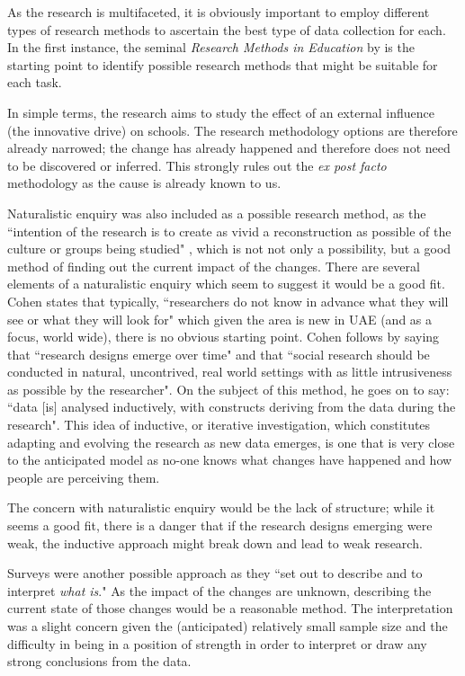 \documentclass[11pt]{article}
\begin{document}
As the research is multifaceted, it is obviously important to employ different types of research methods to ascertain the best type of data collection for each. In the first instance, the seminal \textit{Research Methods in Education} by \citet{Cohen2005} is the starting point to identify possible research methods that might be suitable for each task.

In simple terms, the research aims to study the effect of an external influence (the innovative drive) on schools. The research methodology options are therefore already narrowed; the change has already happened and therefore does not need to be discovered or inferred. This strongly rules out the \textit{ex post facto} methodology as the cause is already known to us.

Naturalistic enquiry was also included as a possible research method, as the ``intention of the research is to create as vivid a reconstruction as possible of the culture or groups being studied" \citep{Cohen2005}, which is not not only a possibility, but a good method of finding out the current impact of the changes. There are several elements of a naturalistic enquiry which seem to suggest it would be a good fit. Cohen states that typically, ``researchers do not know in advance what they will see or what they will look for" \citep{Cohen2005} which given the area is new in UAE (and as a focus, world wide), there is no obvious starting point. Cohen follows by saying that ``research designs emerge over time" and that ``social research should be conducted in natural, uncontrived, real world settings with as little intrusiveness as possible by the researcher". On the subject of this method, he goes on to say: ``data [is] analysed inductively, with constructs deriving from the data during the research". This idea of inductive, or iterative investigation, which constitutes adapting and evolving the research as new data emerges, is one that is very close to the anticipated model as no-one knows what changes have happened and how people are perceiving them. 

The concern with naturalistic enquiry would be the lack of structure; while it seems a good fit, there is a danger that if the research designs emerging were weak, the inductive approach might break down and lead to weak research.

Surveys were another possible approach as they ``set out to describe and to interpret \textit{what is}." \cite[p. 169]{Cohen2005} As the impact of the changes are unknown, describing the current state of those changes would be a reasonable method. The interpretation was a slight concern given the (anticipated) relatively small sample size and the difficulty in being in a position of strength in order to interpret or draw any strong conclusions from the data.
\end{document}
